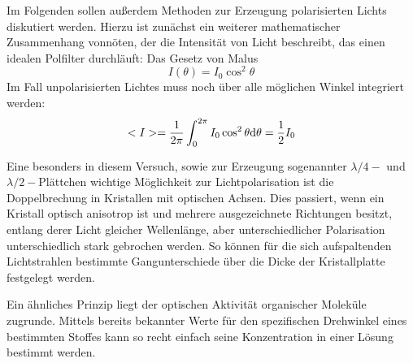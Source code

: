 Im Folgenden sollen außerdem Methoden zur Erzeugung polarisierten Lichts diskutiert werden. Hierzu ist zunächst ein weiterer mathematischer Zusammenhang vonnöten, der die Intensität von Licht beschreibt, das einen idealen Polfilter durchläuft: Das Gesetz von Malus
\begin{equation}
	I(\theta)=I_0\cos^2\theta
\end{equation}
Im Fall unpolarisierten Lichtes muss noch über alle möglichen Winkel integriert werden:
\begin{equation}
	<I>=\frac{1}{2\pi}\int_{0}^{2\pi}I_0\cos^2\theta\mathrm{d}\theta=\frac{1}{2}I_0
\end{equation}

Eine besonders in diesem Versuch, sowie zur Erzeugung sogenannter $\lambda/4-$ und $\lambda/2-$Plättchen wichtige Möglichkeit zur Lichtpolarisation ist die Doppelbrechung in Kristallen mit optischen Achsen. Dies passiert, wenn ein Kristall optisch anisotrop ist und mehrere ausgezeichnete Richtungen besitzt, entlang derer Licht gleicher Wellenlänge, aber unterschiedlicher Polarisation unterschiedlich stark gebrochen werden. So können für die sich aufspaltenden Lichtstrahlen bestimmte Gangunterschiede über die Dicke der Kristallplatte festgelegt werden. 

Ein ähnliches Prinzip liegt der optischen Aktivität organischer Moleküle zugrunde. Mittels bereits bekannter Werte für den spezifischen Drehwinkel eines bestimmten Stoffes kann so recht einfach seine Konzentration in einer Lösung bestimmt werden.
